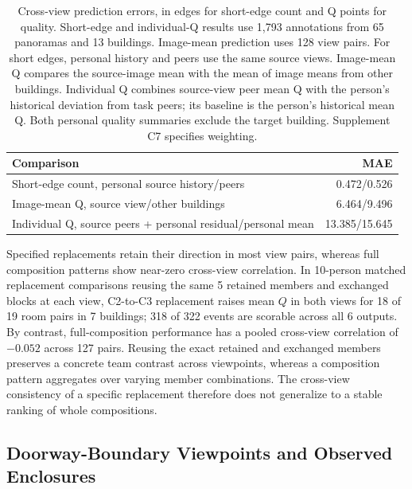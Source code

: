 \begin{table}[t]
\centering\small
\caption{Cross-view prediction errors, in edges for short-edge count and Q points for quality. Short-edge and individual-Q results use 1,793 annotations from 65 panoramas and 13 buildings. Image-mean prediction uses 128 view pairs. For short edges, personal history and peers use the same source views. Image-mean Q compares the source-image mean with the mean of image means from other buildings. Individual Q combines source-view peer mean Q with the person's historical deviation from task peers; its baseline is the person's historical mean Q. Both personal quality summaries exclude the target building. Supplement C7 specifies weighting.}
\label{tab:same-room-evidence}
\setlength{\tabcolsep}{3pt}
\begin{tabular}{@{}p{.65\linewidth}r@{}}
\toprule
Comparison & MAE\\
\midrule
Short-edge count, personal source history/peers & 0.472/0.526\\
Image-mean Q, source view/other buildings & 6.464/9.496\\
Individual Q, source peers + personal residual/personal mean & 13.385/15.645\\
\bottomrule
\end{tabular}
\end{table}




Specified replacements retain their direction in most view pairs, whereas full composition patterns show near-zero cross-view correlation. In 10-person matched replacement comparisons reusing the same 5 retained members and exchanged blocks at each view, C2-to-C3 replacement raises mean $Q$ in both views for 18 of 19 room pairs in 7 buildings; 318 of 322 events are scorable across all 6 outputs. By contrast, full-composition performance has a pooled cross-view correlation of $-0.052$ across 127 pairs. Reusing the exact retained and exchanged members preserves a concrete team contrast across viewpoints, whereas a composition pattern aggregates over varying member combinations. The cross-view consistency of a specific replacement therefore does not generalize to a stable ranking of whole compositions.

\subsection{Doorway-Boundary Viewpoints and Observed Enclosures}
\label{sec:doorway}

